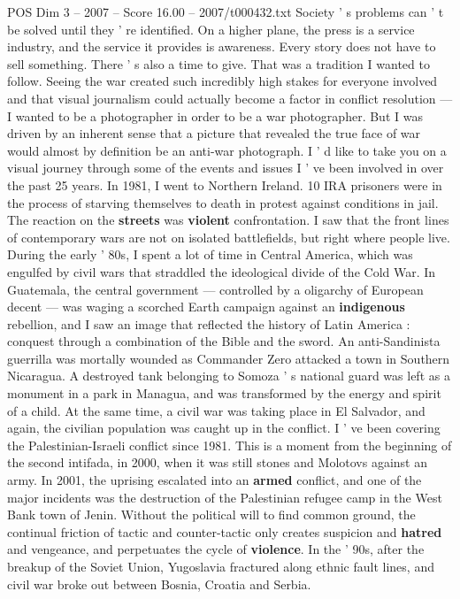\begin{textsample}{POS Dim 3 – 2007 – Score 16.00 – 2007/t000432.txt}
Society ' s problems can ' t be solved until they ' re identified.
On a higher plane, the press is a service industry, and the service it provides is awareness.
Every story does not have to sell something.
There ' s also a time to give.
That was a tradition I wanted to follow.
Seeing the war created such incredibly high stakes for everyone involved and that visual journalism could actually become a factor in conflict resolution — I wanted to be a photographer in order to be a war photographer.
But I was driven by an inherent sense that a picture that revealed the true face of war would almost by definition be an anti-war photograph.
I ' d like to take you on a visual journey through some of the events and issues I ' ve been involved in over the past 25 years.
In 1981, I went to Northern Ireland. 10 IRA prisoners were in the process of starving themselves to death in protest against conditions in jail.
The reaction on the \textbf{streets} was \textbf{violent} confrontation.
I saw that the front lines of contemporary wars are not on isolated battlefields, but right where people live.
During the early ' 80s, I spent a lot of time in Central America, which was engulfed by civil wars that straddled the ideological divide of the Cold War.
In Guatemala, the central government — controlled by a oligarchy of European decent — was waging a scorched Earth campaign against an \textbf{indigenous} rebellion, and I saw an image that reflected the history of Latin America : conquest through a combination of the Bible and the sword.
An anti-Sandinista guerrilla was mortally wounded as Commander Zero attacked a town in Southern Nicaragua.
A destroyed tank belonging to Somoza ' s national guard was left as a monument in a park in Managua, and was transformed by the energy and spirit of a child.
At the same time, a civil war was taking place in El Salvador, and again, the civilian population was caught up in the conflict.
I ' ve been covering the Palestinian-Israeli conflict since 1981.
This is a moment from the beginning of the second intifada, in 2000, when it was still stones and Molotovs against an army.
In 2001, the uprising escalated into an \textbf{armed} conflict, and one of the major incidents was the destruction of the Palestinian refugee camp in the West Bank town of Jenin.
Without the political will to find common ground, the continual friction of tactic and counter-tactic only creates suspicion and \textbf{hatred} and vengeance, and perpetuates the cycle of \textbf{violence}.
In the ' 90s, after the breakup of the Soviet Union, Yugoslavia fractured along ethnic fault lines, and civil war broke out between Bosnia, Croatia and Serbia.

\end{textsample}
